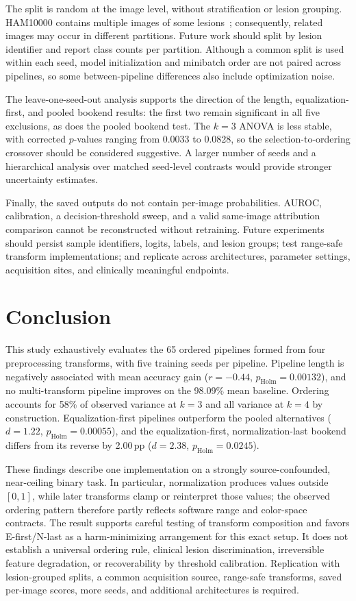 \documentclass[preprint,review,12pt]{elsarticle}
\begin{document}
The split is random at the image level, without stratification or lesion grouping. HAM10000 contains multiple images of some lesions~\cite{Tschandl2018}; consequently, related images may occur in different partitions. Future work should split by lesion identifier and report class counts per partition. Although a common split is used within each seed, model initialization and minibatch order are not paired across pipelines, so some between-pipeline differences also include optimization noise.

The leave-one-seed-out analysis supports the direction of the length, equalization-first, and pooled bookend results: the first two remain significant in all five exclusions, as does the pooled bookend test. The $k=3$ ANOVA is less stable, with corrected $p$-values ranging from 0.0033 to 0.0828, so the selection-to-ordering crossover should be considered suggestive. A larger number of seeds and a hierarchical analysis over matched seed-level contrasts would provide stronger uncertainty estimates.

Finally, the saved outputs do not contain per-image probabilities. AUROC, calibration, a decision-threshold sweep, and a valid same-image attribution comparison cannot be reconstructed without retraining. Future experiments should persist sample identifiers, logits, labels, and lesion groups; test range-safe transform implementations; and replicate across architectures, parameter settings, acquisition sites, and clinically meaningful endpoints.


\section{Conclusion}
\label{sec:conclusion}

This study exhaustively evaluates the 65 ordered pipelines formed from four preprocessing transforms, with five training seeds per pipeline. Pipeline length is negatively associated with mean accuracy gain ($r=-0.44$, $p_{\text{Holm}}=0.00132$), and no multi-transform pipeline improves on the 98.09\% mean baseline. Ordering accounts for 58\% of observed variance at $k=3$ and all variance at $k=4$ by construction. Equalization-first pipelines outperform the pooled alternatives ($d=1.22$, $p_{\text{Holm}}=0.00055$), and the equalization-first, normalization-last bookend differs from its reverse by 2.00\,pp ($d=2.38$, $p_{\text{Holm}}=0.0245$).

These findings describe one implementation on a strongly source-confounded, near-ceiling binary task. In particular, normalization produces values outside $[0,1]$, while later transforms clamp or reinterpret those values; the observed ordering pattern therefore partly reflects software range and color-space contracts. The result supports careful testing of transform composition and favors E-first/N-last as a harm-minimizing arrangement for this exact setup. It does not establish a universal ordering rule, clinical lesion discrimination, irreversible feature degradation, or recoverability by threshold calibration. Replication with lesion-grouped splits, a common acquisition source, range-safe transforms, saved per-image scores, more seeds, and additional architectures is required.
\end{document}
